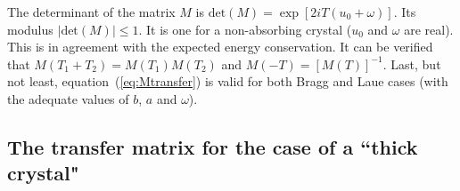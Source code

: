 \documentclass[preprint]{iucr}              %
\begin{document}
The determinant of the matrix $M$ is 
$\text{det}(M)=\exp[2 i T (u_0+\omega)]$. Its modulus $|\text{det}(M)|\le 1$. It is one for a non-absorbing crystal ($u_0$ and $\omega$ are real).
This is in agreement with the expected energy conservation.
It can be verified that $M(T_1+T_2)=M(T_1) M(T_2)$ and $M(-T)=[M(T)]^{-1}$. Last, but not least, equation~(\ref{eq:Mtransfer}) is valid for both Bragg and Laue cases (with the adequate values of $b$, $a$ and $\omega$).

\subsection{The transfer matrix for the case of a ``thick crystal"}
\label{sec:Mthick}
\end{document}
